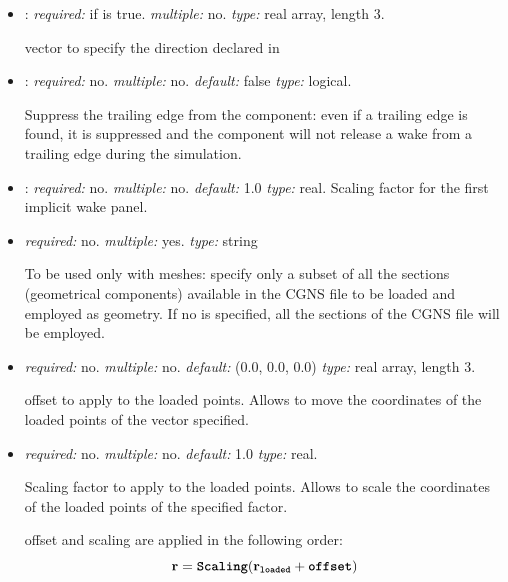 \begin{itemize}
Choose in which way to project the trailing edge. If it is  the 
trailing edge direction will be forced in the direction given in , 
while if it is  the trailing edge will be projected in a plane normal to .

\item {}: \textit{required:} if  is true. 
\textit{multiple:} no. \textit{type:} real array, length 3.

vector to specify the direction declared in 

\item {}: \textit{required:} no. \textit{multiple:} no. \textit{default:} false \textit{type:} logical.

Suppress the trailing edge from the component: even if a trailing edge is found, 
it is suppressed and the component will not release a wake from a trailing edge during the simulation.

\item {}: \textit{required:} no. \textit{multiple:} no. \textit{default:} 1.0 \textit{type:} real. 
Scaling factor for the first implicit wake panel. 

\item {} \textit{required:} no. \textit{multiple:} yes. \textit{type:} string 

To be used only with  meshes: specify only a subset of all the sections (geometrical components) 
available in the CGNS file to be loaded and employed as geometry. 
If no  is specified, all the sections of the CGNS file will be employed.

\item {} \textit{required:} no. \textit{multiple:} no. 
\textit{default:} (0.0, 0.0, 0.0) \textit{type:} real array, length 3.

offset to apply to the loaded points. Allows to move the coordinates of the loaded points of the vector specified. 

\item {} \textit{required:} no. \textit{multiple:} no. \textit{default:} 1.0 \textit{type:} real.

Scaling factor to apply to the loaded points. Allows to scale the coordinates of 
the loaded points of the specified factor.

offset and scaling are applied in the following order:
\begin{equation*}
  \mathbf{r} = \textbf{\texttt{Scaling}} (\mathbf{r}_{\textbf{\texttt{loaded}}} + \textbf{\texttt{offset}})
\end{equation*}
\end{itemize}

